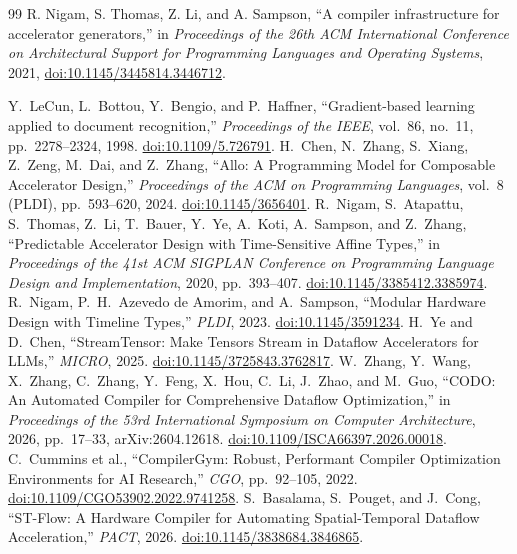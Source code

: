 \documentclass{article}
\newcommand{\doilink}[1]{\href{https://doi.org/#1}{doi:#1}}
\begin{document}
\begin{thebibliography}{99}
R. Nigam, S. Thomas, Z. Li, and A. Sampson,
``A compiler infrastructure for accelerator generators,''
in \emph{Proceedings of the 26th ACM International Conference on Architectural Support for Programming Languages and Operating Systems},
2021, \doilink{10.1145/3445814.3446712}.

 Y.~LeCun, L.~Bottou, Y.~Bengio, and P.~Haffner, ``Gradient-based learning applied to document recognition,'' \emph{Proceedings of the IEEE}, vol.~86, no.~11, pp.~2278--2324, 1998. \doilink{10.1109/5.726791}.
 H.~Chen, N.~Zhang, S.~Xiang, Z.~Zeng, M.~Dai, and Z.~Zhang, ``Allo: A Programming Model for Composable Accelerator Design,'' \emph{Proceedings of the ACM on Programming Languages}, vol.~8 (PLDI), pp.~593--620, 2024. \doilink{10.1145/3656401}.
 R.~Nigam, S.~Atapattu, S.~Thomas, Z.~Li, T.~Bauer, Y.~Ye, A.~Koti, A.~Sampson, and Z.~Zhang, ``Predictable Accelerator Design with Time-Sensitive Affine Types,'' in \emph{Proceedings of the 41st ACM SIGPLAN Conference on Programming Language Design and Implementation}, 2020, pp.~393--407. \doilink{10.1145/3385412.3385974}.
 R.~Nigam, P.~H.~Azevedo de Amorim, and A.~Sampson, ``Modular Hardware Design with Timeline Types,'' \emph{PLDI}, 2023. \doilink{10.1145/3591234}.
 H.~Ye and D.~Chen, ``StreamTensor: Make Tensors Stream in Dataflow Accelerators for LLMs,'' \emph{MICRO}, 2025. \doilink{10.1145/3725843.3762817}.
 W.~Zhang, Y.~Wang, X.~Zhang, C.~Zhang, Y.~Feng, X.~Hou, C.~Li, J.~Zhao, and M.~Guo, ``CODO: An Automated Compiler for Comprehensive Dataflow Optimization,'' in \emph{Proceedings of the 53rd International Symposium on Computer Architecture}, 2026, pp.~17--33, arXiv:2604.12618. \doilink{10.1109/ISCA66397.2026.00018}.
 C.~Cummins et al., ``CompilerGym: Robust, Performant Compiler Optimization Environments for AI Research,'' \emph{CGO}, pp.~92--105, 2022. \doilink{10.1109/CGO53902.2022.9741258}.
 S.~Basalama, S.~Pouget, and J.~Cong, ``ST-Flow: A Hardware Compiler for Automating Spatial-Temporal Dataflow Acceleration,'' \emph{PACT}, 2026. \doilink{10.1145/3838684.3846865}.

\end{thebibliography}
\end{document}
